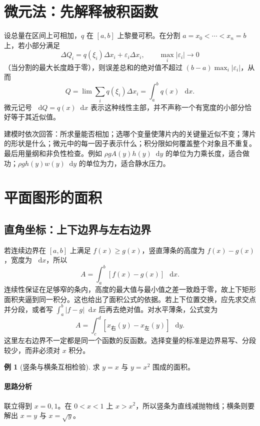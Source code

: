 \documentclass[UTF8,fontset=fandol,12pt,oneside,openany]{ctexrep}
\newcommand{\dd}{\mathop{}\!\mathrm d}
\theoremstyle{definition}
\newtheorem{example}{例}[chapter]
\begin{document}
\section{微元法：先解释被积函数}
\label{lec:12:element}
设总量在区间上可相加，$q$ 在 $[a,b]$ 上黎曼可积。在分割 $a=x_0<\cdots<x_n=b$ 上，若小部分满足
\[
 \Delta Q_i=q(\xi_i)\Delta x_i+\varepsilon_i\Delta x_i,
 \qquad \max_i|\varepsilon_i|\longrightarrow0
\]
（当分割的最大长度趋于零），则误差总和的绝对值不超过
$(b-a)\max_i|\varepsilon_i|$，从而
\[
 Q=\lim\sum_i q(\xi_i)\Delta x_i=\int_a^b q(x)\,\dd x.
\]
微元记号 $\dd Q=q(x)\dd x$ 表示这种线性主部，并不声称一个有宽度的小部分恰好等于其近似值。

建模时依次回答：所求量能否相加；选哪个变量使薄片内的关键量近似不变；薄片的形状是什么；微元中的每一因子表示什么；积分限如何覆盖整个对象且不重复。最后用量纲和非负性检查。例如 $\rho gA(y)h(y)\dd y$ 的单位为力乘长度，适合做功；$\rho gh(y)w(y)\dd y$ 的单位为力，适合静水压力。

\section{平面图形的面积}
\label{lec:12:area}
\subsection{直角坐标：上下边界与左右边界}
若连续边界在 $[a,b]$ 上满足 $f(x)\ge g(x)$，竖直薄条的高度为 $f(x)-g(x)$，宽度为 $\dd x$，所以
\[
 A=\int_a^b[f(x)-g(x)]\,\dd x.
\]
连续性保证在足够窄的条内，高度的最大值与最小值之差一致趋于零，故上下矩形面积夹逼到同一积分。这也给出了面积公式的依据。若上下位置交换，应先求交点并分段，或者写 $\int_a^b|f-g|\dd x$ 后再去绝对值。对水平薄条，公式变为
\[
 A=\int_c^d[x_{\text{右}}(y)-x_{\text{左}}(y)]\,\dd y.
\]
这里左右边界不一定都是同一个函数的反函数。选择变量的标准是边界易写、分段较少，而非必须对 $x$ 积分。

\begin{example}[竖条与横条互相检验]
求 $y=x$ 与 $y=x^2$ 围成的面积。
\end{example}
\paragraph{思路分析}联立得到 $x=0,1$。在 $0<x<1$ 上 $x>x^2$，所以竖条为直线减抛物线；横条则要解出 $x=y$ 与 $x=\sqrt y$。
\end{document}
